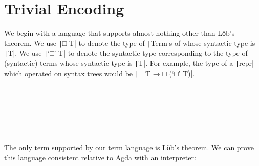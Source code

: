 \section{Trivial Encoding} \label{sec:12-lines}

 We begin with a language that supports almost nothing other than
 Lӧb's theorem.  We use \texttt|□ T| to denote the type of
 \texttt|Term|s of whose syntactic type is
 \texttt|T|.  We use \texttt|‘□’ T| to denote the
 syntactic type corresponding to the type of (syntactic) terms whose
 syntactic type is \texttt|T|.  For example, the type of a
 \texttt|repr| which operated on syntax trees would be
 \texttt|□ T → □ (‘□’ T)|.

\begin{code}%
\>   \AgdaSymbol{:}  \<%
\\
\>[2]\<[3]%
\>[3] \AgdaSymbol{:}     \<%
\\
\>[2]\<[3]%
\>[3] \AgdaSymbol{:}   \<%
\\
%
\\
\>   \AgdaSymbol{:}    \<%
\\
\>[2]\<[3]%
\>[3] \AgdaSymbol{:}  \AgdaSymbol{\{}\AgdaSymbol{\}}   \AgdaSymbol{(}   \AgdaSymbol{)}   \<%
\end{code}
 The only term supported by our term language is Lӧb's theorem.  We
 can prove this language consistent relative to Agda with an
 interpreter:


